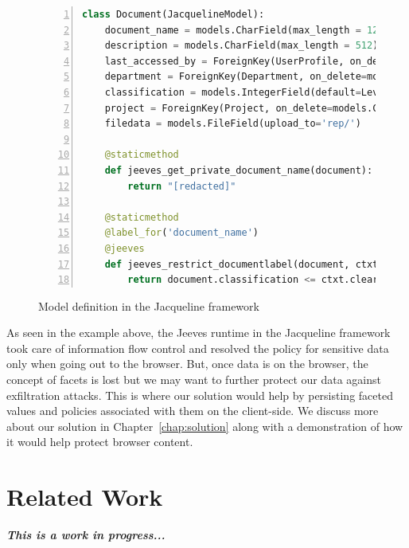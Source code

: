\begin{figure}
\begin{lstlisting}[language=Python, frame=single, breaklines=true, keywordstyle=\color{keywords}, stringstyle=\color{red}, identifierstyle=\color{darkgray}, procnamekeys={def,class}, basicstyle=\footnotesize\ttfamily, numbers=left, extendedchars=true, tabsize=2]
class Document(JacquelineModel):
    document_name = models.CharField(max_length = 128)
    description = models.CharField(max_length = 512)
    last_accessed_by = ForeignKey(UserProfile, on_delete=models.CASCADE)
    department = ForeignKey(Department, on_delete=models.CASCADE)
    classification = models.IntegerField(default=Levels.TOP_SECRET)
    project = ForeignKey(Project, on_delete=models.CASCADE)
    filedata = models.FileField(upload_to='rep/')

    @staticmethod
    def jeeves_get_private_document_name(document):
        return "[redacted]"

    @staticmethod
    @label_for('document_name')
    @jeeves
    def jeeves_restrict_documentlabel(document, ctxt):
        return document.classification <= ctxt.clearance and document.department == ctxt.department
\end{lstlisting}
\caption{Model definition in the Jacqueline framework}
\label{fig:DRS}
\end{figure}

As seen in the example above, the Jeeves runtime in the Jacqueline framework took
care of information flow control and resolved the policy for sensitive data only
when going out to the browser. But, once data is on the browser, the concept of
facets is lost but we may want to further protect our data against exfiltration
attacks. This is where our solution would help by persisting faceted values and
policies associated with them on the client-side. We discuss more about our solution
in Chapter~\ref{chap:solution} along with a demonstration of how it would help
protect browser content.

\section{Related Work}
\textbf{\textit{This is a work in progress...}}
\cite{DataExfilCSP} \cite{SelfExfil}
\cite{SecuringWebContent}
\cite{Faceted}
